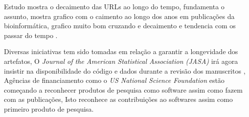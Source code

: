 
Estudo mostra o decaimento das URLs ao longo do tempo, fundamenta o assunto,
mostra grafico com o caimento ao longo dos anos em publicações da
bioinformática, grafico muito bom cruzando e decaimento e tendencia com os
passar do tempo \cite{wren2017use}.



Diversas iniciativas tem sido tomadas em relação a garantir a longevidade dos
artefatos, O {\it Journal of the American Statistical Association (JASA)} irá
agora insistir na disponibilidade do código e dados durante a revisão dos
manuscritos \cite{baker2016scientists}, Agências de financiamento como o {\it
US National Science Foundation} estão começando a reconhecer produtos de
pesquisa como software assim como fazem com as publicações, Isto reconhece as
contribuições ao softwares assim como primeiro produto de pesquisa.




